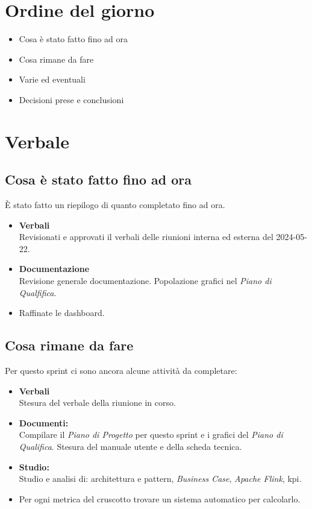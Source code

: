 \documentclass[italian,12pt]{article}
\begin{document}
\section{Ordine del giorno}
\begin{itemize}
	\item Cosa è stato fatto fino ad ora
	\item Cosa rimane da fare
	\item Varie ed eventuali
	\item Decisioni prese e conclusioni
\end{itemize}

\newpage

\section{Verbale}

\subsection{Cosa è stato fatto fino ad ora}
È stato fatto un riepilogo di quanto completato fino ad ora.
\begin{itemize}
	\item \textbf{Verbali} \\
	      Revisionati e approvati il verbali delle riunioni interna ed esterna del 2024-05-22.
	\item \textbf{Documentazione} \\
	      Revisione generale documentazione. Popolazione grafici nel \textit{Piano di Qualfifica}.
	\item Raffinate le dashboard.
\end{itemize}

\subsection{Cosa rimane da fare}
Per questo sprint ci sono ancora alcune attività da completare:
\begin{itemize}
	\item \textbf{Verbali} \\
		  Stesura del verbale della riunione in corso.
	\item \textbf{Documenti:} \\
		  Compilare il \textit{Piano di Progetto} per questo sprint e i grafici del \textit{Piano di Qualifica}. Stesura del manuale utente e della scheda tecnica. 
	\item \textbf{Studio:} \\
		  Studio e analisi di: architettura e pattern, \textit{Business Case}, \textit{Apache Flink}, kpi.
	\item Per ogni metrica del cruscotto trovare un sistema automatico per calcolarlo.
\end{itemize}
\end{document}
